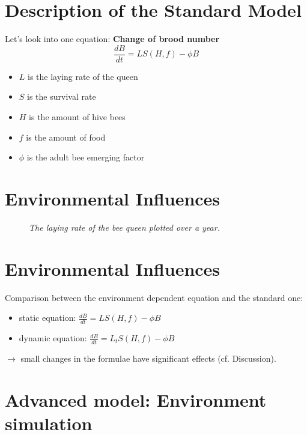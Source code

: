 \documentclass[
	paper=128mm:96mm,
	fontsize=11pt,
	pagesize,
	parskip=half-,
]{scrartcl}
\theoremstyle{mythmstyle} %
\begin{document}
\section*{Description of the Standard Model}
	Let's look into one equation: \textbf{Change of brood number}
	\begin{equation*}
			\frac{dB}{dt} = LS(H,f)-\phi B
	\end{equation*}
	\begin{itemize}
	\item $L$ is the laying rate of the queen
	\item $S$ is the survival rate
	\item $H$ is the amount of hive bees
	\item $f$ is the amount of food
	\item $\phi$ is the adult bee emerging factor
	\end{itemize}
	\clearpage
\section{Environmental Influences}
	\begin{figure}[H]
		\centering
		\caption{\textit{The laying rate of the bee queen plotted over a year.}}
	\end{figure}
	\clearpage
\section*{Environmental Influences}
	Comparison between the environment dependent equation and the standard one: 
	\begin{itemize}
		\item static equation: $	\frac{dB}{dt} = LS(H,f)-\phi B $
		\item dynamic equation: $\frac{dB}{dt} = L_tS(H,f)-\phi B$
	\end{itemize}
	$\longrightarrow$ small changes in the formulae have significant effects (cf. Discussion).
	\clearpage
\section{Advanced model: Environment simulation}
	
	\clearpage
\end{document}
